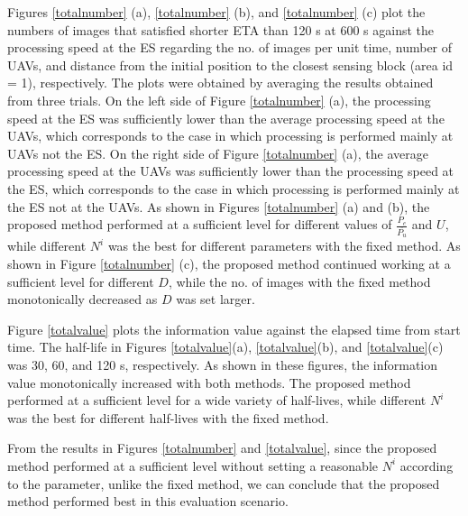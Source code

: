 \documentclass{ieeeaccess}
\begin{document}
Figures \ref{totalnumber} (a), \ref{totalnumber} (b), and \ref{totalnumber} (c) plot the numbers of images that satisfied shorter ETA than 120 s at 600 s against the processing speed at the ES regarding the no. of images per unit time, number of UAVs, and distance from the initial position to the closest sensing block (area id = 1), respectively. The plots were obtained by averaging the results obtained from three trials. On the left side of Figure \ref{totalnumber} (a), the processing speed at the ES was sufficiently lower than the average processing speed at the UAVs, which corresponds to the case in which processing is performed mainly at UAVs not the ES. On the right side of Figure \ref{totalnumber} (a), the average processing speed at the UAVs was sufficiently lower than the processing speed at the ES, which corresponds to the case in which processing is performed mainly at the ES not at the UAVs. As shown in Figures \ref{totalnumber} (a) and (b), the proposed method performed at a sufficient level for different values of $\frac{P_e}{\overline{P_u}}$ and $U$, while different $N^i$ was the best for different parameters with the fixed method. As shown in Figure \ref{totalnumber} (c), the proposed method continued working at a sufficient level for different $D$, while the no. of images with the fixed method monotonically decreased as $D$ was set larger.

Figure \ref{totalvalue} plots the information value against the elapsed time from start time. The half-life in Figures \ref{totalvalue}(a), \ref{totalvalue}(b), and \ref{totalvalue}(c) was 30, 60, and 120 s, respectively. As shown in these figures, the information value monotonically increased with both methods. The proposed method performed at a sufficient level for a wide variety of half-lives, while different $N^i$ was the best for different half-lives with the fixed method.

From the results in Figures \ref{totalnumber} and \ref{totalvalue}, since the proposed method performed at a sufficient level without setting a reasonable $N^i$ according to the parameter, unlike the fixed method, we can conclude that the proposed method performed best in this evaluation scenario.
\end{document}
